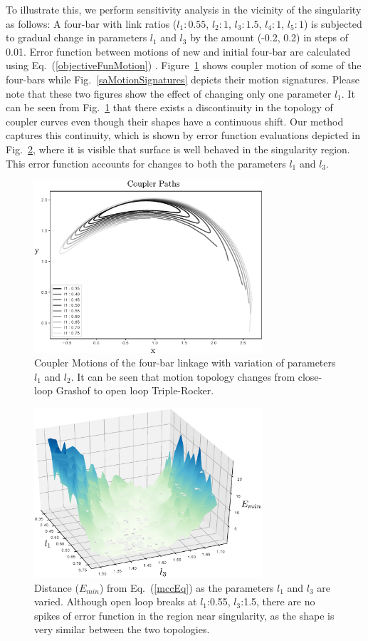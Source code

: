 \documentclass[twocolumn,10pt]{asme2ej}
\newcommand{\req}[1]{(\ref{#1})}
\begin{document}
To illustrate this, we perform sensitivity analysis in the vicinity of the singularity as follows:
A four-bar with link ratios ($l_1:0.55$, $l_2:1$, $l_3:1.5$, $l_4:1$, $l_5:1$) is subjected to gradual change in parameters $l_1$ and $l_3$ by the amount (-0.2, 0.2) in steps of 0.01.
Error function between motions of new and initial four-bar are calculated using Eq.~\req{objectiveFunMotion} .
Figure~\ref{saCouplerCurves} shows coupler motion of some of the four-bars while Fig.~\ref{saMotionSignatures} depicts their motion signatures. Please note that these two figures show the effect of changing only one parameter $l_1$.
It can be seen from Fig.~\ref{saCouplerCurves} that there exists a discontinuity in the topology of coupler curves even though their shapes have a continuous shift.
Our method captures this continuity, which is shown by error function evaluations depicted in Fig.~\ref{saErrorFunction}, where it is visible that surface is well behaved in the singularity region. This error function accounts for changes to both the parameters $l_1$ and $l_3$.

\begin{figure}
\centering
\includegraphics[width=240pt]{figure/fig_sa_coupler_curves.eps}
  \caption{Coupler Motions of the four-bar linkage with variation of parameters $l_1$ and $l_2$. It can be seen that motion topology changes from close-loop Grashof to open loop Triple-Rocker.}
\label{saCouplerCurves}
\end{figure}

\begin{figure}
\centering
\includegraphics[width=240pt]{figure/fig_sa_distance_function.eps}
  \caption{Distance ($E_{min}$) from Eq.~\req{mccEq} as the parameters $l_1$ and $l_3$ are varied. Although open loop breaks at $l_1$:0.55, $l_3$:1.5, there are no spikes of error function in the region near singularity, as the shape is very similar between the two topologies.}
\label{saErrorFunction}
\end{figure}
\end{document}
